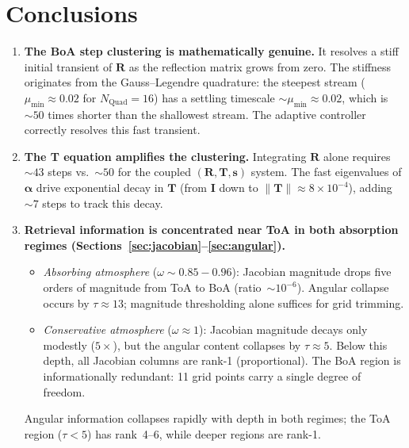 \documentclass[11pt]{article}
\newcommand{\bR}{\mathbf{R}}
\newcommand{\bT}{\mathbf{T}}
\newcommand{\bs}{\mathbf{s}}
\newcommand{\bI}{\mathbf{I}}
\newcommand{\balpha}{\boldsymbol{\alpha}}
\newcommand{\norm}[1]{\lVert #1 \rVert}
\begin{document}
\section{Conclusions}

\begin{enumerate}
\item \textbf{The BoA step clustering is mathematically genuine.}
  It resolves a stiff initial transient of $\bR$ as the
  reflection matrix grows from zero.  The stiffness originates
  from the Gauss--Legendre quadrature: the steepest stream
  ($\mu_\mathrm{min}\approx 0.02$ for $N_\mathrm{Quad}=16$) has
  a settling timescale ${\sim}\mu_\mathrm{min}\approx 0.02$,
  which is ${\sim}50$ times shorter than the shallowest stream.
  The adaptive controller correctly resolves this fast
  transient.

\item \textbf{The T equation amplifies the clustering.}
  Integrating $\bR$ alone requires ${\sim}43$ steps vs.\
  ${\sim}50$ for the coupled $(\bR,\bT,\bs)$ system.  The
  fast eigenvalues of $\balpha$ drive exponential decay in
  $\bT$ (from $\bI$ down to $\norm{\bT}\approx 8\times10^{-4}$),
  adding ${\sim}7$ steps to track this decay.

\item \textbf{Retrieval information is concentrated near ToA
  in both absorption regimes
  (Sections~\ref{sec:jacobian}--\ref{sec:angular}).}
  \begin{itemize}
  \item \emph{Absorbing atmosphere}
    ($\omega \sim 0.85{-}0.96$): Jacobian magnitude drops
    five orders of magnitude from ToA to BoA
    (ratio~${\sim}10^{-6}$).  Angular collapse occurs by
    $\tau\approx 13$; magnitude thresholding alone suffices
    for grid trimming.
  \item \emph{Conservative atmosphere}
    ($\omega \approx 1$): Jacobian magnitude decays only
    modestly ($5\times$), but the angular content collapses
    by $\tau\approx 5$.  Below this depth, all Jacobian
    columns are rank-1 (proportional).  The BoA region is
    informationally redundant: 11 grid points carry a
    single degree of freedom.
  \end{itemize}
  Angular information collapses rapidly with depth in both
  regimes; the ToA region ($\tau < 5$) has rank~4--6, while
  deeper regions are rank-1.


\end{enumerate}
\end{document}
